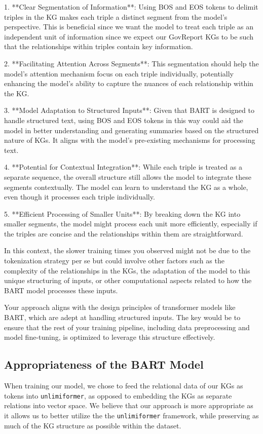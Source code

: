 \documentclass[12pt]{article}
\begin{document}
1. **Clear Segmentation of Information**: Using BOS and EOS tokens to delimit triples in the KG makes each triple a distinct segment from the model's perspective. This is beneficial since we want the model to treat each triple as an independent unit of information since we expect our GovReport KGs to be such that the relationships within triples contain key information.

2. **Facilitating Attention Across Segments**: This segmentation should help the model's attention mechanism focus on each triple individually, potentially enhancing the model's ability to capture the nuances of each relationship within the KG.

3. **Model Adaptation to Structured Inputs**: Given that BART is designed to handle structured text, using BOS and EOS tokens in this way could aid the model in better understanding and generating summaries based on the structured nature of KGs. It aligns with the model's pre-existing mechanisms for processing text.

4. **Potential for Contextual Integration**: While each triple is treated as a separate sequence, the overall structure still allows the model to integrate these segments contextually. The model can learn to understand the KG as a whole, even though it processes each triple individually.

5. **Efficient Processing of Smaller Units**: By breaking down the KG into smaller segments, the model might process each unit more efficiently, especially if the triples are concise and the relationships within them are straightforward.

In this context, the slower training times you observed might not be due to the tokenization strategy per se but could involve other factors such as the complexity of the relationships in the KGs, the adaptation of the model to this unique structuring of inputs, or other computational aspects related to how the BART model processes these inputs.

Your approach aligns with the design principles of transformer models like BART, which are adept at handling structured inputs. The key would be to ensure that the rest of your training pipeline, including data preprocessing and model fine-tuning, is optimized to leverage this structure effectively.

\subsection*{Appropriateness of the BART Model}
When training our model, we chose to feed the relational data of our KGs as tokens into \texttt{unlimiformer}, as opposed to embedding the KGs as separate relations into vector space. We believe that our approach is more appropriate as it allows us to better utilize the the \texttt{unlimiformer} framework, while preserving as much of the KG structure as possible within the dataset.
\end{document}
